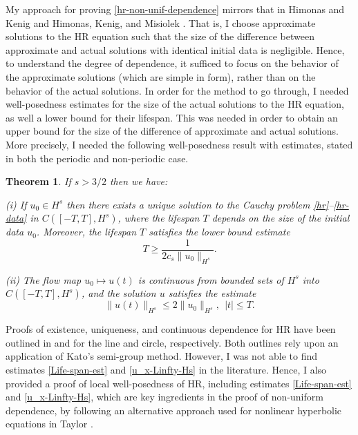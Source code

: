 \documentclass[12pt,reqno]{amsart}
\theoremstyle{plain}  %
\newtheorem{theorem}{Theorem}
\theoremstyle{definition}
\begin{document}
%
%
My approach  for proving \autoref{hr-non-unif-dependence}  
mirrors that in Himonas and Kenig \cite{Himonas_2009_Non-uniform-dep} and 
Himonas, Kenig, and Misiolek \cite{Himonas_2009_Non-uniform-dep-per}.
That is, I choose 
approximate solutions to the HR equation such that the size of the difference between approximate and actual solutions with 
identical initial data is negligible. Hence, to understand the degree of 
dependence, it sufficed to focus on the behavior of the approximate 
solutions (which are simple in form), rather than on the behavior of the 
actual solutions. In order for the method to go through, I needed 
well-posedness estimates for the size of the 
actual solutions to the HR equation, as well a 
lower bound for their lifespan. This was needed in order to obtain an upper 
bound for the size of the difference of approximate and actual solutions. 
More precisely, I needed the following well-posedness result  with estimates,  
stated in both the  periodic and non-periodic case.
%
%
%
%
%
%
\begin{theorem}
\label{thm:HR_existence_continuous_dependence}
If   $s>3/2$  then we have:

(i) If $u_0\in H^s$  then  there exists a unique solution to
the Cauchy problem  \eqref{hr}--\eqref{hr-data} in $C([-T, T], H^s)$, where 
the lifespan  $T$ depends on the size
of the initial data $u_0$. Moreover, 
the  lifespan $T$ satisfies the lower bound estimate 
%
%
%
\begin{equation}
\label{Life-span-est}
T
\ge
\frac{1}{2c_s \|u_0\|_{H^s}}.
\end{equation}
%

(ii)
The flow map $u_0 \mapsto u(t)$ is continuous from
bounded sets of $H^s$ into \\ $C([-T, T], H^s)$,
and the solution $u$ satisfies the estimate
%
%
%
\begin{equation}
\label{u_x-Linfty-Hs}
\|
u(t)
\|_ {H^s}
\le
2
\|
u_0
\|_{H^s}, \ \ |t|\le T.
\end{equation}
%
%
%
\end{theorem}
%
%
Proofs of 
existence, uniqueness, and continuous dependence for HR
have been outlined in \cite{Yin_2003_On-the-Cauchy-p} and 
\cite{Zhou_2005_Local-well-pose} for the line and circle, 
respectively. Both outlines rely upon an application of Kato's semi-group 
method. However, I was not able to find estimates  
\eqref{Life-span-est} and \eqref{u_x-Linfty-Hs}  in the literature.
Hence, I also provided a proof of local well-posedness of HR,
including  estimates \eqref{Life-span-est} and \eqref{u_x-Linfty-Hs},
which are key ingredients in the proof of non-uniform dependence, by 
following an alternative approach used for nonlinear hyperbolic equations
in Taylor \cite{Taylor_1991_Pseudodifferent}.
\end{document}
